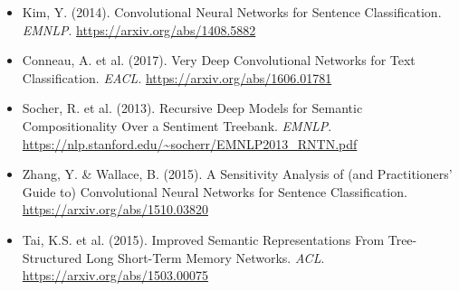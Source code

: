 \documentclass[a4paper]{article}
\begin{document}
\begin{itemize}
    \item Kim, Y. (2014). Convolutional Neural Networks for Sentence Classification. \textit{EMNLP}. \url{https://arxiv.org/abs/1408.5882}
    \item Conneau, A. et al. (2017). Very Deep Convolutional Networks for Text Classification. \textit{EACL}. \url{https://arxiv.org/abs/1606.01781}
    \item Socher, R. et al. (2013). Recursive Deep Models for Semantic Compositionality Over a Sentiment Treebank. \textit{EMNLP}. \url{https://nlp.stanford.edu/~socherr/EMNLP2013_RNTN.pdf}
    \item Zhang, Y. \& Wallace, B. (2015). A Sensitivity Analysis of (and Practitioners' Guide to) Convolutional Neural Networks for Sentence Classification. \url{https://arxiv.org/abs/1510.03820}
    \item Tai, K.S. et al. (2015). Improved Semantic Representations From Tree-Structured Long Short-Term Memory Networks. \textit{ACL}. \url{https://arxiv.org/abs/1503.00075}
\end{itemize}
\end{document}
